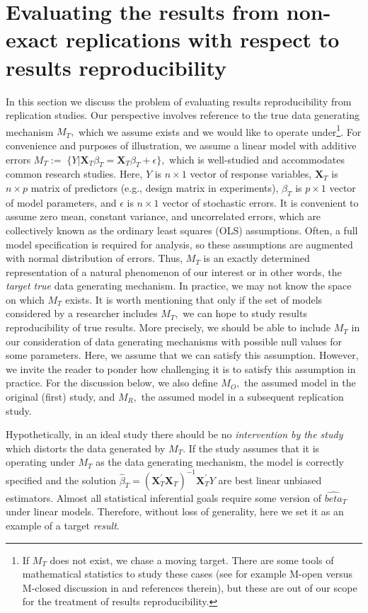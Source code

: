 \documentclass[meta,authordate,issue]{jote-new-article}
\newcommand{\X}{\mathbf{X}}
\newcounter{result}
\begin{document}
\section{Evaluating the results from non-exact replications with respect to results reproducibility}

In this section we discuss the problem of evaluating results reproducibility from replication studies. Our perspective involves reference to the true data generating mechanism $M_T,$ which we assume exists and we would like to operate under\footnote{If $M_T$ does not exist, we chase a moving target. There are some tools of mathematical statistics to study these cases (see for example  M-open versus M-closed discussion in \cite{bernardosmith2000} and references therein), but these are out of our scope for the treatment of results reproducibility.}. For convenience and purposes of illustration, we assume a linear model with additive errors $M_T:= \; \{Y|\X_T\beta_T = \X_T\beta_T+\epsilon\},$
which is well-studied and accommodates common research studies. Here, $Y$ is $n \times 1$ vector of response variables, $\X_T$ is $n \times p$ matrix of predictors (e.g., design matrix in experiments), $\beta_T$ is $p \times 1$ vector of model parameters, and $\epsilon$ is $n \times 1$ vector of stochastic errors. It is convenient to assume zero mean, constant variance, and uncorrelated errors, which are collectively known as the ordinary least squares (OLS) assumptions. Often, a full model specification is required for analysis, so these assumptions are augmented with normal distribution of errors. Thus, $M_T$ is an exactly determined representation of a natural phenomenon of our interest or in other words, the {\em target true} data generating mechanism. In practice, we may not know the space on which $M_T$ exists. It is worth mentioning that only if the set of models considered by a researcher includes $M_T,$ we can hope to study results reproducibility of true results. More precisely, we should be able to include $M_T$ in our consideration of data generating mechanisms with possible null values for some parameters. Here, we assume that we can satisfy this assumption. However, we invite the reader to ponder how challenging it is to satisfy this assumption in practice. For the discussion below, we also define $M_O,$ the assumed model in the original (first) study, and $M_R,$ the assumed model in a subsequent replication study.

Hypothetically, in an ideal study there should be no {\em intervention by the study} which distorts the data generated by $M_T.$ If the study assumes that it is operating under $M_T$ as the data generating mechanism, the model is correctly specified and the solution $\hat{\beta}_{T}= (\X_{T}^{'}\X_{T})^{-1}\X_{T}^{'} Y$ are best linear unbiased estimators. Almost all statistical inferential goals require some version of $\hat{beta}_T$ under linear models. Therefore, without loss of generality, here we set it as an example of a target {\em result}.
\end{document}
